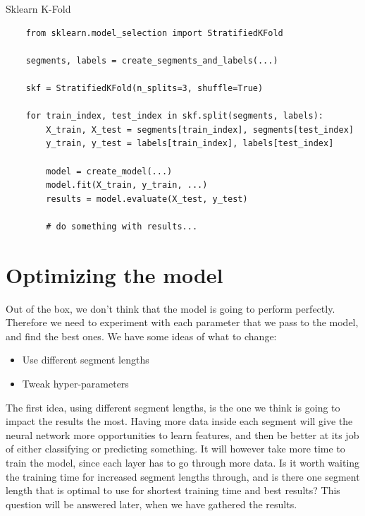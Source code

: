 \begin{code}
    \caption{Sklearn K-Fold}
    \label{code:sklearn_k_fold}
    
    \begin{verbatim}
    from sklearn.model_selection import StratifiedKFold

    segments, labels = create_segments_and_labels(...)

    skf = StratifiedKFold(n_splits=3, shuffle=True)

    for train_index, test_index in skf.split(segments, labels):
        X_train, X_test = segments[train_index], segments[test_index]
        y_train, y_test = labels[train_index], labels[test_index]

        model = create_model(...)
        model.fit(X_train, y_train, ...)
        results = model.evaluate(X_test, y_test)

        # do something with results...

    \end{verbatim}
\end{code}

\section{Optimizing the model}

\noindent Out of the box, we don't think that the model is going to perform perfectly. Therefore we need to experiment with each parameter that we pass to
the model, and find the best ones. We have some ideas of what to change:

\begin{itemize}
    \item Use different segment lengths
    \item Tweak hyper-parameters
\end{itemize}

\noindent The first idea, using different segment lengths, is the one we think is going to impact the results the most. Having more data inside each segment 
will give the neural network more opportunities to learn features, and then be better at its job of either classifying or predicting something. 
It will however take more time to train the model, since each layer has to go through more data. Is it worth waiting the training time 
for increased segment lengths through, and is there one segment length that is optimal to use for shortest training time and best results?
This question will be answered later, when we have gathered the results.

